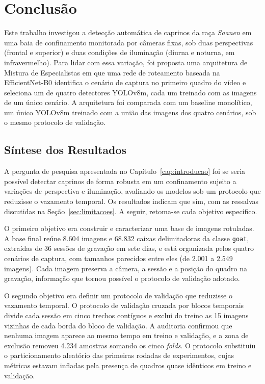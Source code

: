 %
%
%
\chapter{Conclusão}
\label{cap:conclusao}

Este trabalho investigou a detecção automática de caprinos da raça \textit{Saanen} em uma baia de confinamento monitorada por câmeras fixas, sob duas perspectivas (frontal e superior) e duas condições de iluminação (diurna e noturna, em infravermelho). Para lidar com essa variação, foi proposta uma arquitetura de Mistura de Especialistas em que uma rede de roteamento baseada na EfficientNet-B0 identifica o cenário de captura no primeiro quadro do vídeo e seleciona um de quatro detectores YOLOv8m, cada um treinado com as imagens de um único cenário. A arquitetura foi comparada com um baseline monolítico, um único YOLOv8m treinado com a união das imagens dos quatro cenários, sob o mesmo protocolo de validação.

\section{Síntese dos Resultados}
\label{sec:sintese-resultados}

A pergunta de pesquisa apresentada no Capítulo~\ref{cap:introducao} foi se seria possível detectar caprinos de forma robusta em um confinamento sujeito a variações de perspectiva e iluminação, avaliando os modelos sob um protocolo que reduzisse o vazamento temporal. Os resultados indicam que sim, com as ressalvas discutidas na Seção~\ref{sec:limitacoes}. A seguir, retoma-se cada objetivo específico.

O primeiro objetivo era construir e caracterizar uma base de imagens rotuladas. A base final reúne 8.604 imagens e 68.832 caixas delimitadoras da classe \texttt{goat}, extraídas de 36 sessões de gravação em sete dias, e está organizada pelos quatro cenários de captura, com tamanhos parecidos entre eles (de 2.001 a 2.549 imagens). Cada imagem preserva a câmera, a sessão e a posição do quadro na gravação, informação que tornou possível o protocolo de validação adotado.

O segundo objetivo era definir um protocolo de validação que reduzisse o vazamento temporal. O protocolo de validação cruzada por blocos temporais divide cada sessão em cinco trechos contíguos e exclui do treino as 15 imagens vizinhas de cada borda do bloco de validação. A auditoria confirmou que nenhuma imagem aparece ao mesmo tempo em treino e validação, e a zona de exclusão removeu 4.234 amostras somando os cinco \textit{folds}. O protocolo substituiu o particionamento aleatório das primeiras rodadas de experimentos, cujas métricas estavam infladas pela presença de quadros quase idênticos em treino e validação.

